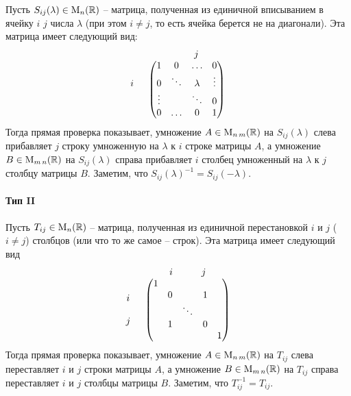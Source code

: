 Пусть $S_{ij}(\lambda)\in\operatorname{M}_{n}(\mathbb R)$ -- матрица, полученная из единичной вписыванием в ячейку $i$ $j$ числа $\lambda$ (при этом $i\neq j$, то есть ячейка берется не на диагонали).
Эта матрица имеет следующий вид:
\[
\begin{tabular}{cc}
{}&{\quad \quad $j$}\\
{
$
\begin{matrix}
{}\\{i}\\{}\\{}
\end{matrix}
$}&{
$
\begin{pmatrix}
{1}&{0}&{\ldots}&{0}\\
{0}&{\ddots}&{\lambda}&{\vdots}\\
{\vdots}&{}&{\ddots}&{0}\\
{0}&{\ldots}&{0}&{1}\\
\end{pmatrix}
$
}
\end{tabular}
\]
Тогда прямая проверка показывает, умножение $A\in\operatorname{M}_{n\,m}(\mathbb R)$ на $S_{ij}(\lambda)$ слева прибавляет $j$ строку умноженную на $\lambda$ к $i$ строке матрицы $A$, а умножение $B\in\operatorname{M}_{m\,n}(\mathbb R)$ на $S_{ij}(\lambda)$ справа прибавляет $i$ столбец умноженный на $\lambda$ к $j$ столбцу матрицы $B$.
Заметим, что $S_{ij}(\lambda)^{-1} = S_{ij}(-\lambda)$.

\paragraph{Тип II}

Пусть $T_{ij}\in\operatorname{M}_{n}(\mathbb R)$ -- матрица, полученная из единичной перестановкой $i$ и $j$ ($i\neq j$) столбцов (или что то же самое -- строк).
Эта матрица имеет следующий вид
\[
\begin{tabular}{cc}
{}&{$i$\quad \quad\quad $j$}\\
{
$
\begin{matrix}
{}\\{i}\\{}\\{j}\\{}
\end{matrix}
$}&{
$
\begin{pmatrix}
{1}&{}&{}&{}&{}\\
{}&{0}&{}&{1}&{}\\
{}&{}&{\ddots}&{}&{}\\
{}&{1}&{}&{0}&{}\\
{}&{}&{}&{}&{1}\\
\end{pmatrix}
$
}
\end{tabular}
\]
Тогда прямая проверка показывает, умножение $A\in\operatorname{M}_{n\,m}(\mathbb R)$ на $T_{ij}$ слева переставляет $i$ и $j$ строки матрицы $A$, а умножение $B\in\operatorname{M}_{m\,n}(\mathbb R)$ на $T_{ij}$ справа переставляет $i$ и $j$ столбцы матрицы $B$.
Заметим, что $T_{ij}^{-1} = T_{ij}$.



